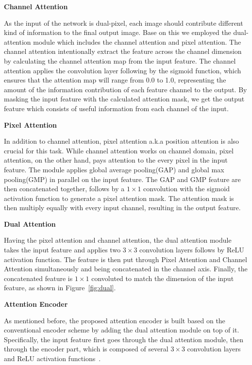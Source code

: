 \documentclass[final]{cvpr}
\begin{document}
\textbf{Channel Attention}

As the input of the network is dual-pixel, each image should contribute different kind of information to the final output image. Base on this we employed the dual-attention module which includes the channel attention and pixel attention. The channel attention intentionally extract the feature across the channel dimension by calculating the channel attention map from the input feature. The channel attention applies the convolution layer following by the sigmoid function, which ensures that the attention map will range from 0.0 to 1.0, representing the amount of the information contribution of each feature channel to the output. By masking the input feature with the calculated attention mask,  we get the output feature which consists of useful information from each channel of the input.

\textbf{Pixel Attention}

In addition to channel attention, pixel attention a.k.a position attention is also crucial for this task. While channel attention works on channel domain, pixel attention, on the other hand, pays attention to the every pixel in the input feature. The module applies global average pooling(GAP) and global max pooling(GMP) in parallel on the input feature. The GAP and GMP feature are then concatenated together, follows by a $1\times1$ convolution with the sigmoid activation function to generate a pixel attention mask. The attention mask is then multiply equally with every input channel, resulting in the output feature.

\textbf{Dual Attention}

Having the pixel attention and channel attention, the dual attention module takes the input feature and applies two $3\times3$ convolution layers follows by ReLU~\cite{relu} activation function. The feature is then put through Pixel Attention and Channel Attention simultaneously and being concatenated in the channel axis. Finally, the concatenated feature is $1\times1$ convoluted to match the dimension of the input feature, as shown in Figure~\ref{fig:dual}.

\textbf{Attention Encoder}

As mentioned before, the proposed attention encoder is built based on the conventional encoder scheme by adding the dual attention module on top of it. Specifically, the input feature first goes through the dual attention module, then through the encoder part, which is composed of several $3\times3$ convolution layers and ReLU activation functions~\cite{relu}.
\end{document}
